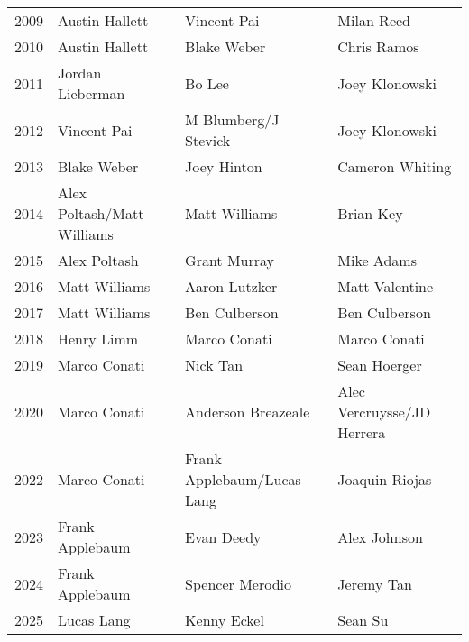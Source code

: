 \begin{table}[htbp]
\begin{tabular}{clll}
2009 & Austin Hallett & Vincent Pai & Milan Reed \\
2010 & Austin Hallett & Blake Weber & Chris Ramos \\
2011 & Jordan Lieberman & Bo Lee & Joey Klonowski \\
2012 & Vincent Pai & M Blumberg/J Stevick & Joey Klonowski \\
2013 & Blake Weber & Joey Hinton & Cameron Whiting \\
2014 & Alex Poltash/Matt Williams & Matt Williams & Brian Key \\
2015 & Alex Poltash & Grant Murray & Mike Adams \\
2016 & Matt Williams & Aaron Lutzker & Matt Valentine \\
2017 & Matt Williams & Ben Culberson & Ben Culberson \\
2018 & Henry Limm & Marco Conati & Marco Conati \\
2019 & Marco Conati & Nick Tan & Sean Hoerger \\
2020 & Marco Conati & Anderson Breazeale & Alec Vercruysse/JD Herrera \\
2022 & Marco Conati & Frank Applebaum/Lucas Lang & Joaquin Riojas \\
2023 & Frank Applebaum & Evan Deedy & Alex Johnson \\
2024 & Frank Applebaum & Spencer Merodio & Jeremy Tan \\
2025 & Lucas Lang & Kenny Eckel & Sean Su \\
\bottomrule
\end{tabular}
\end{table}


